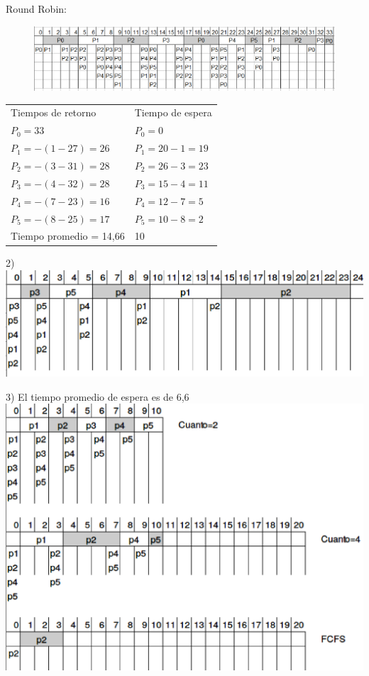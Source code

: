 \documentclass[a4paper]{article}
\begin{document}
Round Robin:\\
\begin{figure}[!htb]
\includegraphics[scale=0.60]{Round-Robin.eps}
\end{figure}
\begin{tabular}{l l}
Tiempos de retorno 		& Tiempo de espera\\
$P_0 = 33$   		 	& $P_0 = 0$ \\
$P_1 =-(1 - 27)= 26$ 	& $P_1 = 20-1= 19$ \\
$P_2 =-(3 - 31)= 28$ 	& $P_2 = 26-3= 23$\\
$P_3 =-(4 - 32)= 28$ 	& $P_3 = 15-4= 11$\\
$P_4 =-(7 - 23)= 16$ 	& $P_4 = 12-7= 5$\\
$P_5 =-(8 - 25)= 17$ 	& $P_5 = 10-8= 2$\\
Tiempo promedio = 14,66 & 10
\end{tabular}

2)\\
\includegraphics[scale=0.5]{Ejercicio-2.eps}

3) El tiempo promedio de espera es de 6,6\\
\includegraphics[scale=0.5]{Ejercicio-3.eps}
\end{document}
